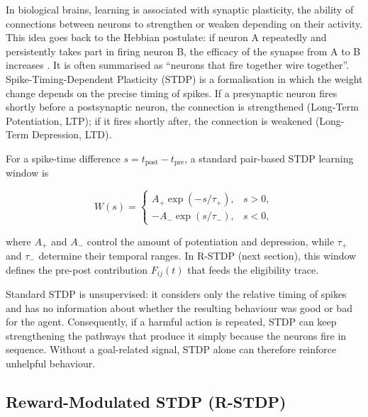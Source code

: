 In biological brains, learning is associated with synaptic plasticity, the ability of connections between neurons to strengthen or weaken depending on their activity. This idea goes back to the Hebbian postulate: if neuron A repeatedly and persistently takes part in firing neuron B, the efficacy of the synapse from A to B increases \cite{hebb1949,gerstner2014}. It is often summarised as ``neurons that fire together wire together''. Spike-Timing-Dependent Plasticity (STDP) is a formalisation in which the weight change depends on the precise timing of spikes. If a presynaptic neuron fires shortly before a postsynaptic neuron, the connection is strengthened (Long-Term Potentiation, LTP); if it fires shortly after, the connection is weakened (Long-Term Depression, LTD).

For a spike-time difference $s=t_{\mathrm{post}}-t_{\mathrm{pre}}$, a standard pair-based STDP learning window is

\begin{equation}
W(s) =
\begin{cases}
    A_{+}\exp(-s/\tau_{+}), & s>0,\\
    -A_{-}\exp(s/\tau_{-}), & s<0,
\end{cases}
\end{equation}

where $A_{+}$ and $A_{-}$ control the amount of potentiation and depression, while $\tau_{+}$ and $\tau_{-}$ determine their temporal ranges. In R-STDP (next section), this window defines the pre-post contribution $F_{ij}(t)$ that feeds the eligibility trace.

Standard STDP is unsupervised: it considers only the relative timing of spikes and has no information about whether the resulting behaviour was good or bad for the agent. Consequently, if a harmful action is repeated, STDP can keep strengthening the pathways that produce it simply because the neurons fire in sequence. Without a goal-related signal, STDP alone can therefore reinforce unhelpful behaviour.

\subsection{Reward-Modulated STDP (R-STDP)}
\label{sec:rstdp}


